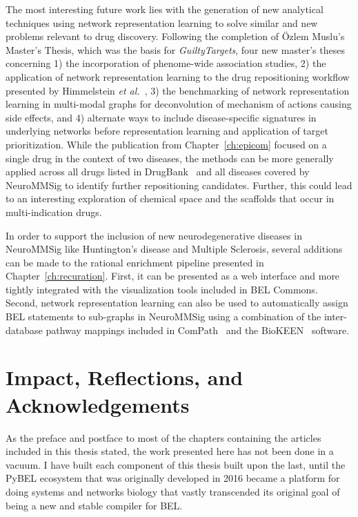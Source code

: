 The most interesting future work lies with the generation of new analytical techniques using network representation learning to solve similar and new problems relevant to drug discovery.
Following the completion of \"{O}zlem Muslu's Master's Thesis, which was the basis for \textit{GuiltyTargets}, four new master's theses concerning 1) the incorporation of phenome-wide association studies, 2) the application of network representation learning to the drug repositioning workflow presented by Himmelstein \textit{et al.}~\cite{Himmelstein2017}, 3) the benchmarking of network representation learning in multi-modal graphs for deconvolution of mechanism of actions causing side effects, and 4) alternate ways to include disease-specific signatures in underlying networks before representation learning and application of target prioritization.
While the publication from Chapter~\ref{ch:epicom} focused on a single drug in the context of two diseases, the methods can be more generally applied across all drugs listed in DrugBank~\cite{Wishart2018} and all diseases covered by NeuroMMSig to identify further repositioning candidates.
Further, this could lead to an interesting exploration of chemical space and the scaffolds that occur in multi-indication drugs.

In order to support the inclusion of new neurodegenerative diseases in NeuroMMSig like Huntington's disease and Multiple Sclerosis, several additions can be made to the rational enrichment pipeline presented in Chapter~\ref{ch:recuration}.
First, it can be presented as a web interface and more tightly integrated with the visualization tools included in BEL Commons.
Second, network representation learning can also be used to automatically assign \ac{BEL} statements to sub-graphs in NeuroMMSig using a combination of the inter-database pathway mappings included in ComPath~\cite{Domingo-Fernandez2018} and the BioKEEN~\cite{Ali2019} software.

\section{Impact, Reflections, and Acknowledgements}

As the preface and postface to most of the chapters containing the articles included in this thesis stated, the work presented here has not been done in a vacuum.
I have built each component of this thesis built upon the last, until the PyBEL ecosystem that was originally developed in 2016 became a platform for doing systems and networks biology that vastly transcended its original goal of being a new and stable compiler for \ac{BEL}.

